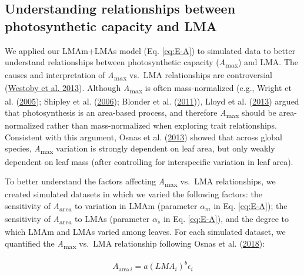 \documentclass[
  12pt,
]{article}
\begin{document}
\hypertarget{understanding-relationships-between-photosynthetic-capacity-and-lma}{%
\subsection{Understanding relationships between photosynthetic capacity and LMA}\label{understanding-relationships-between-photosynthetic-capacity-and-lma}}

We applied our LMAm+LMAs model (Eq. \eqref{eq:E-A}) to simulated data to better understand relationships between photosynthetic capacity (\emph{A}\textsubscript{max}) and LMA.
The causes and interpretation of \emph{A}\textsubscript{max} vs.~LMA relationships are controversial (\protect\hyperlink{ref-Westoby2013}{Westoby et al. 2013}).
Although \emph{A}\textsubscript{max} is often mass-normalized (e.g., Wright et al. (\protect\hyperlink{ref-Wright2005}{2005}); Shipley et al. (\protect\hyperlink{ref-Shipley2006}{2006}); Blonder et al. (\protect\hyperlink{ref-Blonder2011}{2011})), Lloyd et al. (\protect\hyperlink{ref-Lloyd2013}{2013}) argued that photosynthesis is an area-based process, and therefore \emph{A}\textsubscript{max} should be area-normalized rather than mass-normalized when exploring trait relationships.
Consistent with this argument, Osnas et al. (\protect\hyperlink{ref-Osnas2013}{2013}) showed that across global species, \emph{A}\textsubscript{max} variation is strongly dependent on leaf area, but only weakly dependent on leaf mass (after controlling for interspecific variation in leaf area).

To better understand the factors affecting \emph{A}\textsubscript{max} vs.~LMA relationships, we created simulated datasets in which we varied the following factors: the sensitivity of \emph{A}\textsubscript{area} to variation in LMAm (parameter \(\alpha_m\) in Eq. \eqref{eq:E-A}); the sensitivity of \emph{A}\textsubscript{area} to LMAs (parameter \(\alpha_s\) in Eq. \eqref{eq:E-A}), and the degree to which LMAm and LMAs varied among leaves.
For each simulated dataset, we quantified the \emph{A}\textsubscript{max} vs.~LMA relationship following Osnas et al. (\protect\hyperlink{ref-Osnas2018}{2018}):

\begin{align}
A_{\mathrm{area} \, i} = a (LMA_i)^{b}\epsilon_i \label{eq:mass}
\end{align}
\end{document}

